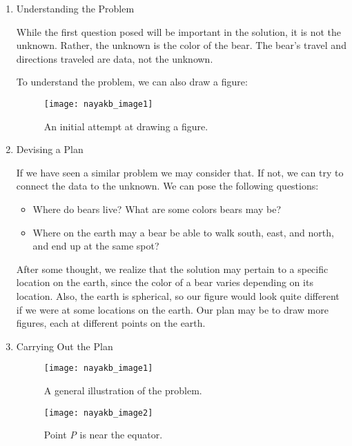 \begin{enumerate}
   \item Understanding the Problem
  
   While the first question posed will be important in the solution, it is not the unknown. Rather, the unknown is the color of the bear. The bear’s travel and directions traveled are data, not the unknown.
   
   To understand the problem, we can also draw a figure:
   
   \begin{figure}[htp]
    \centering
    \begin{minipage}{6cm}
    \texttt{[image: nayakb\_image1]}
    \caption{An initial attempt at drawing a figure.}
    \label{fig:1}
    \end{minipage}
\end{figure}

\pagebreak
   \item Devising a Plan
   
   If we have seen a similar problem we may consider that. If not, we can try to connect the data to the unknown. We can pose the following questions:
   
   \begin{itemize}
     \item Where do bears live? What are some colors bears may be?
     \item Where on the earth may a bear be able to walk south, east, and north, and end up at the same spot?
   \end{itemize}
   
   After some thought, we realize that the solution may pertain to a specific location on the earth, since the color of a bear varies depending on its location. Also, the earth is spherical, so our figure would look quite different if we were at some locations on the earth. Our plan may be to draw more figures, each at different points on the earth.
   
   \item Carrying Out the Plan
   
\begin{figure}[!htb]
   \begin{minipage}{0.48\textwidth}
     \centering
     \texttt{[image: nayakb\_image1]}
     \caption{A general illustration of the problem.}\label{Fig:1}
   \end{minipage}\hfill
   \begin{minipage}{0.48\textwidth}
     \centering
     \texttt{[image: nayakb\_image2]}
     \caption{Point \emph{P} is near the equator.}\label{Fig:2}
   \end{minipage}
\end{figure}


\end{enumerate}
